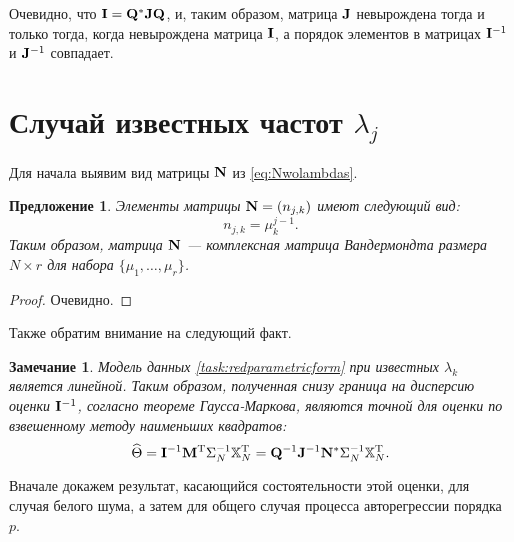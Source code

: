 \documentclass[12pt,a4paper]{article}
\newtheorem{proposition}{Предложение}
\newtheorem{remark}{Замечание}
\begin{document}
Очевидно, что $\mathbf{I} = \mathbf{Q}^* \mathbf{J} \mathbf{Q}$, и, таким образом, матрица $\mathbf{J}$ невырождена тогда и только тогда, когда невырождена матрица $\mathbf{I}$, а порядок элементов в матрицах $\mathbf{I}^{-1}$ и $\mathbf{J}^{-1}$ совпадает.

\section{Случай известных частот $\lambda_j$}
Для начала выявим вид матрицы $\mathbf{N}$ из \eqref{eq:Nwolambdas}.

\begin{proposition}
	Элементы матрицы $\mathbf{N} = (n_{j, k})$ имеют следующий вид:
	\begin{equation*}
	n_{j, k} = \mu_k^{j-1}.
	\end{equation*}
	Таким образом, матрица $\mathbf{N}$ --- комплексная матрица Вандермондта размера $N \times r$ для набора $\{\mu_1, \ldots, \mu_r\}$.
\end{proposition}
\begin{proof}
	Очевидно.
\end{proof}

Также обратим внимание на следующий факт.
\begin{remark}
	Модель данных \eqref{task:redparametricform} при известных $\lambda_k$ является линейной. Таким образом, полученная снизу граница на дисперсию оценки $\mathbf{I}^{-1}$, согласно теореме Гаусса-Маркова, являются точной для оценки по взвешенному методу наименьших квадратов: 
	\begin{equation*}
	\widehat \Theta = \mathbf{I}^{-1}\mathbf{M}^{\mathrm{T}} \Sigma_N^{-1} \mathbb{X}_N^{\mathrm{T}}  = \mathbf{Q}^{-1}\mathbf{J}^{-1} \mathbf{N}^* \Sigma_N^{-1} \mathbb{X}_N^{\mathrm{T}}.
	\end{equation*}
\end{remark}

Вначале докажем результат, касающийся состоятельности этой оценки, для случая белого шума, а затем для общего случая процесса авторегрессии порядка $p$.
\end{document}

